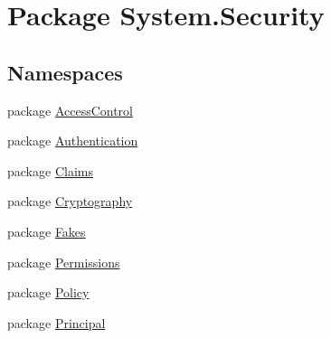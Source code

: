 \hypertarget{namespace_system_1_1_security}{\section{Package System.\-Security}
\label{namespace_system_1_1_security}
}
\subsection*{Namespaces}
\begin{DoxyCompactItemize}
\item 
package \hyperlink{namespace_system_1_1_security_1_1_access_control}{Access\-Control}
\item 
package \hyperlink{namespace_system_1_1_security_1_1_authentication}{Authentication}
\item 
package \hyperlink{namespace_system_1_1_security_1_1_claims}{Claims}
\item 
package \hyperlink{namespace_system_1_1_security_1_1_cryptography}{Cryptography}
\item 
package \hyperlink{namespace_system_1_1_security_1_1_fakes}{Fakes}
\item 
package \hyperlink{namespace_system_1_1_security_1_1_permissions}{Permissions}
\item 
package \hyperlink{namespace_system_1_1_security_1_1_policy}{Policy}
\item 
package \hyperlink{namespace_system_1_1_security_1_1_principal}{Principal}
\end{DoxyCompactItemize}
